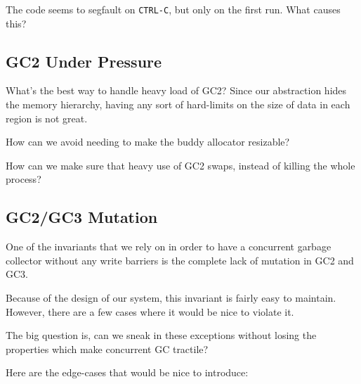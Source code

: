 The code seems to segfault on \lstinline|CTRL-C|, but only on the
first run.  What causes this?

\subsection{GC2 Under Pressure}

What's the best way to handle heavy load of GC2?  Since our abstraction
hides the memory hierarchy, having any sort of hard-limits on the size
of data in each region is not great.

How can we avoid needing to make the buddy allocator resizable?

How can we make sure that heavy use of GC2 swaps, instead of killing
the whole process?

\subsection{GC2/GC3 Mutation}

One of the invariants that we rely on in order to have a concurrent
garbage collector without any write barriers is the complete lack
of mutation in GC2 and GC3.

Because of the design of our system, this invariant is fairly easy
to maintain.  However, there are a few cases where it would be nice to
violate it.

The big question is, can we sneak in these exceptions without losing
the properties which make concurrent GC tractile?

Here are the edge-cases that would be nice to introduce:

